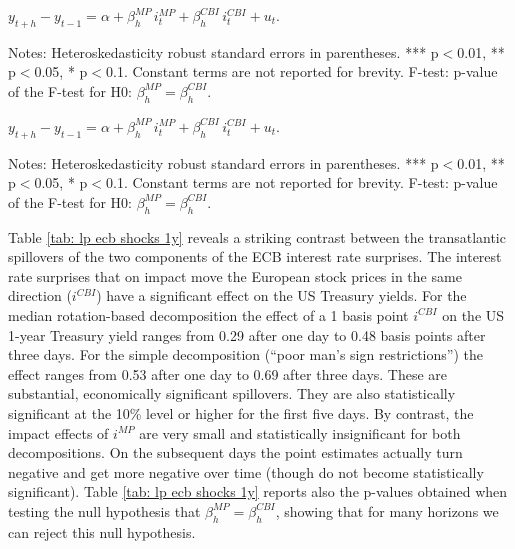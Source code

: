 \documentclass[a4paper,12pt]{article}
\newcommand{\pathTables}{../workm_lp/}
\begin{document}
\begin{table}[!htbp]
\begin{center}
\caption{The effect of ECB monetary policy and information shocks on financial variables}\label{tab: lp ecb shocks 1y}
$y^{}_{t+h}-y^{}_{t-1} = \alpha + \beta^{MP}_h\, i^{MP}_t + \beta^{CBI}_h\, i^{CBI}_t + u_t.$
\small
{}
\end{center}\footnotesize
Notes: Heteroskedasticity robust standard errors in parentheses. *** p$<$0.01, ** p$<$0.05, * p$<$0.1.
Constant terms are not reported for brevity.
F-test: p-value of the F-test for H0: $\beta^{MP}_h=\beta^{CBI}_h$.
\end{table}

\begin{table}[!htbp]
\begin{center}
\caption{The effect of ECB monetary policy and information shocks on financial variables}\label{tab: lp ecb shocks 1y pctiles}
$y^{}_{t+h}-y^{}_{t-1} = \alpha + \beta^{MP}_h\, i^{MP}_t + \beta^{CBI}_h\, i^{CBI}_t + u_t.$
\small
{}
\end{center}\footnotesize
Notes: Heteroskedasticity robust standard errors in parentheses. *** p$<$0.01, ** p$<$0.05, * p$<$0.1.
Constant terms are not reported for brevity.
F-test: p-value of the F-test for H0: $\beta^{MP}_h=\beta^{CBI}_h$.
\end{table}

Table \ref{tab: lp ecb shocks 1y} reveals a striking contrast between the transatlantic spillovers
of the two components of the ECB interest rate surprises.
The interest rate surprises
that on impact move the European stock prices in the same direction ($i^{CBI}$) have a significant effect
on the US Treasury yields. 
For the median rotation-based decomposition the effect of a 1 basis point $i^{CBI}$ on the US 1-year Treasury yield
ranges from 0.29 after one day to 0.48 basis points after three days. 
For the simple decomposition (``poor man's sign restrictions'') the effect ranges from 0.53 after one day to 0.69 after three days.
These are substantial, economically significant spillovers. They are also statistically significant at the 10\% level or higher for the first five days.
By contrast, the impact effects of $i^{MP}$ are very small and statistically insignificant for both decompositions. On the subsequent days the point estimates actually turn negative and get more negative over time (though do not become statistically significant).
Table \ref{tab: lp ecb shocks 1y} reports also the p-values obtained when testing
the null hypothesis that $\beta^{MP}_h=\beta^{CBI}_h$, showing that for many horizons we can
reject this null hypothesis.
\end{document}
